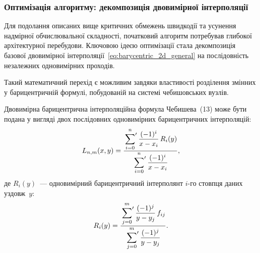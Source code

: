 \subsubsection{Оптимізація алгоритму: декомпозиція двовимірної інтерполяції}

Для подолання описаних вище критичних обмежень швидкодії та усунення
надмірної обчислювальної складності, початковий алгоритм потребував
глибокої архітектурної перебудови. Ключовою ідеєю оптимізації стала декомпозиція базової двовимірної
інтерполяції~\eqref{eq:barycentric_2d_general} на послідовність
незалежних одновимірних проходів.

Такий математичний перехід є можливим завдяки властивості розділення
змінних у барицентричній формулі, побудованій на системі чебишовських
вузлів.

\begin{statement}
	\label{st:decomposition}
	Двовимірна барицентрична інтерполяційна формула Чебишева~(13) може бути
	подана у вигляді двох послідовних одновимірних барицентричних
	інтерполяцій:
	\begin{equation}
		L_{n,m}(x, y) = \frac{\sideset{}{'}\sum\limits_{i=0}^{n}
			\dfrac{(-1)^{i}}{x - x_i}\, R_i(y)}
		{\sideset{}{'}\sum\limits_{i=0}^{n}
			\dfrac{(-1)^{i}}{x - x_i}},
		\label{eq:separated}
	\end{equation}
	де $R_i(y)$~--- одновимірний барицентричний інтерполянт $i$-го стовпця
	даних уздовж~$y$:
	\begin{equation}
		R_i(y) = \frac{\sideset{}{'}\sum\limits_{j=0}^{m}
			\dfrac{(-1)^{j}}{y - y_j}\, f_{ij}}
		{\sideset{}{'}\sum\limits_{j=0}^{m}
			\dfrac{(-1)^{j}}{y - y_j}}.
		\label{eq:Ri}
	\end{equation}
\end{statement}

